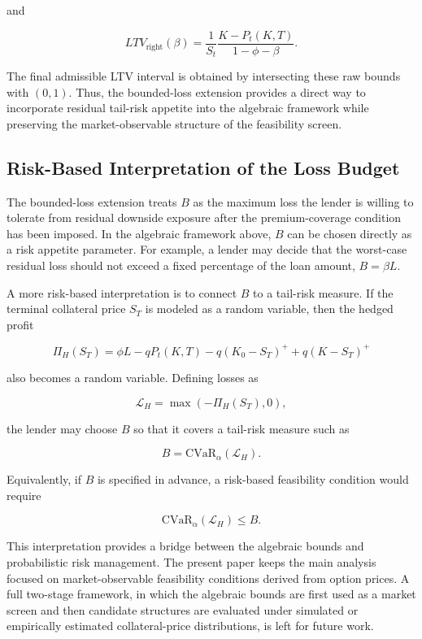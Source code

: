 \documentclass[11pt]{article}
\begin{document}
and

$$
LTV_{\text{right}}(\beta)
=
\frac{1}{S_t}
\frac{K-P_t(K,T)}{1-\phi-\beta}.
$$

The final admissible LTV interval is obtained by intersecting these raw bounds with $(0,1)$. Thus, the bounded-loss extension provides a direct way to incorporate residual tail-risk appetite into the algebraic framework while preserving the market-observable structure of the feasibility screen.

\subsection{Risk-Based Interpretation of the Loss Budget}

The bounded-loss extension treats $B$ as the maximum loss the lender is willing to tolerate from residual downside exposure after the premium-coverage condition has been imposed. In the algebraic framework above, $B$ can be chosen directly as a risk appetite parameter. For example, a lender may decide that the worst-case residual loss should not exceed a fixed percentage of the loan amount, $B=\beta L$.

A more risk-based interpretation is to connect $B$ to a tail-risk measure. If the terminal collateral price $S_T$ is modeled as a random variable, then the hedged profit

$$
\Pi_H(S_T) = 
\phi L -
qP_t(K,T) -
q(K_0-S_T)^+
+
q(K-S_T)^+
$$

also becomes a random variable. Defining losses as

$$
\mathcal{L}_H=\max(-\Pi_H(S_T),0),
$$

the lender may choose $B$ so that it covers a tail-risk measure such as

$$
B = \text{CVaR}_{\alpha}(\mathcal{L}_H).
$$

Equivalently, if $B$ is specified in advance, a risk-based feasibility condition would require

$$
\text{CVaR}_{\alpha}(\mathcal{L}_H) \leq B.
$$

This interpretation provides a bridge between the algebraic bounds and probabilistic risk management. The present paper keeps the main analysis focused on market-observable feasibility conditions derived from option prices. A full two-stage framework, in which the algebraic bounds are first used as a market screen and then candidate structures are evaluated under simulated or empirically estimated collateral-price distributions, is left for future work.
\end{document}
